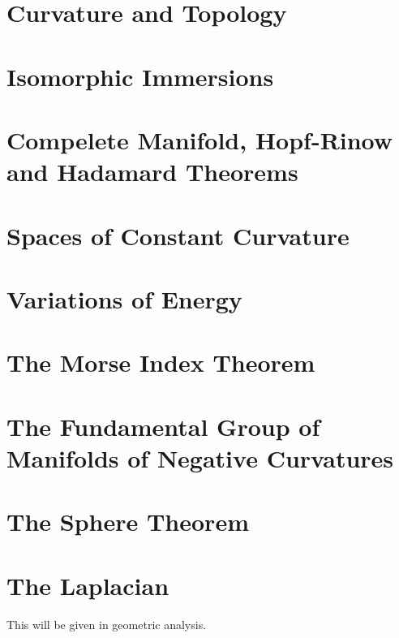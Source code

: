 \documentclass[Total.tex]{subfiles}
\begin{document}
	\chapter{Curvature and Topology}
	\chapter{Isomorphic Immersions}
	\chapter{Compelete Manifold, Hopf-Rinow and Hadamard Theorems}
	\chapter{Spaces of Constant Curvature}
	\chapter{Variations of Energy}
	\chapter{The Morse Index Theorem}
	\chapter{The Fundamental Group of Manifolds of Negative Curvatures}
	\chapter{The Sphere Theorem}
	\chapter{The Laplacian}
		This will be given in geometric analysis.
\end{document}
